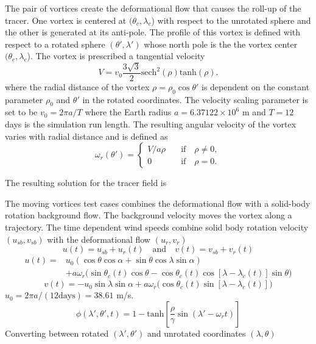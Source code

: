 The pair of vortices create the deformational flow that causes the roll-up of
the tracer. One vortex is centered at $(\theta_c,\lambda_c$) with respect
to the unrotated sphere and the other is generated at its anti-pole.  The
profile of this vortex is defined with respect to a rotated sphere $(\theta',\lambda')$
whose north pole is the the vortex center $(\theta_c,\lambda_c$).
The vortex is prescribed a tangential velocity
\begin{equation}
   \label{eq:defrotvtan} V =v_0\frac{3\sqrt{3}}{2}\mathrm{sech}^2(\rho)\mathrm{tanh}(\rho).
\end{equation}
where the radial distance of the vortex 
$\rho = \rho_0 \cos\theta'$ is dependent on the constant parameter $\rho_0$ and
$\theta'$ in the rotated coordinates.
The velocity scaling parameter is set to be $v_0 = 2\pi a / T$ where the Earth radius 
$a=6.37122 \times 10^6$ m and
$T=12$ days is the simulation run length.
The resulting angular velocity of the vortex varies with radial distance and is
defined as
\begin{equation}
   \label{eq:defrotomega} 
   \omega_r (\theta ') = \begin{cases}
     V / a\rho & \quad\mathrm{if}\quad \rho\neq 0, \\
     0  & \quad\mathrm{if}\quad \rho = 0.
   \end{cases}
\end{equation}



The resulting solution for the tracer field is


The moving vortices test cases combines the deformational flow
with a solid-body rotation background flow. The background velocity moves
the vortex along a trajectory. 
The time dependent wind speeds combine solid body rotation velocity $(u_{sb}, v_{sb})$
with the deformational flow $(u_r, v_r)$ 
\begin{equation}
    \label{eq:defrotvel}
    u(t) = u_{sb} + u_r(t) \quad \mathrm{and} \quad v(t) = v_{sb} + v_r(t)
\end{equation}
\begin{equation}
  \label{eq:defrotu} 
  \begin{split} u(t) = & u_0\left(\cos\theta\cos\alpha + \sin\theta\cos\lambda\sin\alpha\right) \\
     & +  a\omega_r \big(\sin\theta_c(t)\cos\theta - \cos\theta_c(t)\cos\left[\lambda - \lambda_c(t)\right]\sin\theta\big)
   \end{split}
\end{equation}
\begin{equation}
  \label{eq:defrotv} v(t) = - u_0 \sin\lambda\sin\alpha + a\omega_r\big(\cos\theta_c(t)\sin\left[\lambda - \lambda_c(t)\right]\big)
\end{equation}
$u_0 = 2\pi a / (12 \mathrm{  days}) = 38.61$ m/s.
\begin{equation}
    \label{eq:defroth} \phi(\lambda',\theta', t) = 1 - \mathrm{tanh}\left[\frac{\rho}{\gamma}\sin\left(\lambda' - \omega_r t\right)\right]
\end{equation}
Converting between rotated $(\lambda',\theta')$ and unrotated coordinates $(\lambda,\theta)$